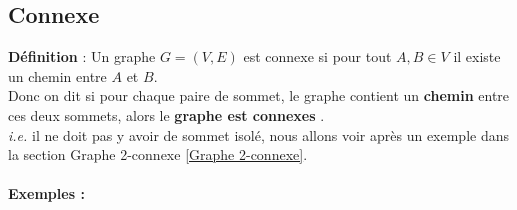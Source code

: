 \documentclass[hidelinks,letterpaper,12pt]{article}
\newcounter{Exemple} %
\begin{document}
\subsection{Connexe}
\label{Connexe}
\textbf{Définition} : Un graphe \( G = (V, E) \) est connexe si pour tout \( A,B \in V \) il existe un chemin entre $A$ et $B$. \\ 
Donc on dit si pour chaque paire de sommet, le graphe contient un \textbf{chemin} entre ces deux sommets, alors le \textbf{graphe est connexes} \citep{ChristianLaforest}.
\\
\textit{i.e.} il ne doit pas y avoir de sommet isolé, nous allons voir après un exemple dans la section Graphe 2-connexe \ref{Graphe 2-connexe}.
\\ \\ 
\textbf{Exemples :}
\\
\end{document}
